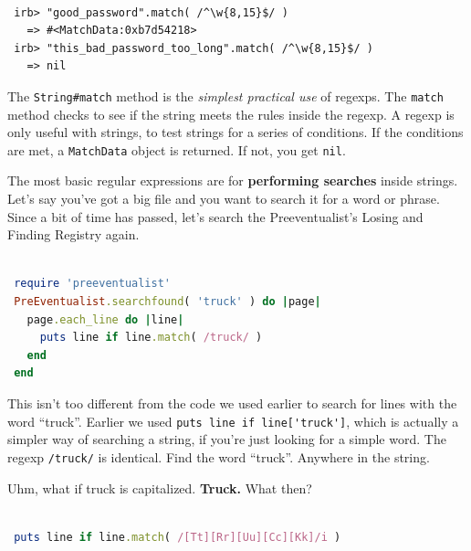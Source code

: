 \documentclass[10pt,twoside]{report}
\begin{document}
\begin{lstlisting}

 irb> "good_password".match( /^\w{8,15}$/ )
   => #<MatchData:0xb7d54218>
 irb> "this_bad_password_too_long".match( /^\w{8,15}$/ )
   => nil

\end{lstlisting}


The \lstinline[breaklines=true]|String#match| method is the {\em
  simplest practical use} of regexps.  The
\lstinline[breaklines=true]|match| method checks to see if the string
meets the rules inside the regexp.  A regexp is only useful with
strings, to test strings for a series of conditions.  If the
conditions are met, a \lstinline[breaklines=true]|MatchData| object is
returned.  If not, you get \lstinline[breaklines=true]|nil|.

The most basic regular expressions are for {\bf performing searches}
inside strings.  Let's say you've got a big file and you want to
search it for a word or phrase.  Since a bit of time has passed, let's
search the Preeventualist's Losing and Finding Registry again.


\begin{lstlisting}[basicstyle=\ttfamily\color{basiccolor},
    commentstyle = \ttfamily\color{commentcolor},
    keywordstyle=\ttfamily\color{keywordscolor},
    stringstyle=\color{stringcolor},
    language=Ruby,
    basicstyle=\small\ttfamily,
    showstringspaces=false,
  ]

 require 'preeventualist'
 PreEventualist.searchfound( 'truck' ) do |page|
   page.each_line do |line|
     puts line if line.match( /truck/ )
   end
 end

\end{lstlisting}


This isn't too different from the code we used earlier to search for
lines with the word ``truck''.  Earlier we used
\lstinline[breaklines=true]|puts line if line['truck']|, which is
actually a simpler way of searching a string, if you're just looking
for a simple word.  The regexp \lstinline[breaklines=true]|/truck/| is
identical.  Find the word ``truck''.  Anywhere in the string.

Uhm, what if truck is capitalized.  {\bf Truck.}  What then?


\begin{lstlisting}[basicstyle=\ttfamily\color{basiccolor},
    commentstyle = \ttfamily\color{commentcolor},
    keywordstyle=\ttfamily\color{keywordscolor},
    stringstyle=\color{stringcolor},
    language=Ruby,
    basicstyle=\small\ttfamily,
    showstringspaces=false,
  ]

 puts line if line.match( /[Tt][Rr][Uu][Cc][Kk]/i )

\end{lstlisting}
\end{document}
